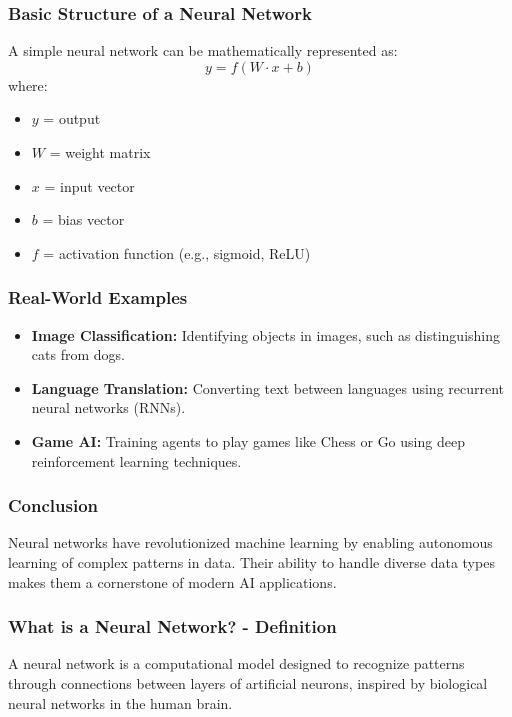 \documentclass{beamer}
\begin{document}
\begin{frame}[fragile]
    \frametitle{Basic Structure of a Neural Network}
    A simple neural network can be mathematically represented as:  
    \begin{equation}
        y = f(W \cdot x + b)
    \end{equation}
    where:
    \begin{itemize}
        \item $y$ = output
        \item $W$ = weight matrix
        \item $x$ = input vector
        \item $b$ = bias vector
        \item $f$ = activation function (e.g., sigmoid, ReLU)
    \end{itemize}
\end{frame}

\begin{frame}[fragile]
    \frametitle{Real-World Examples}
    \begin{itemize}
        \item \textbf{Image Classification:} 
            Identifying objects in images, such as distinguishing cats from dogs.
        \item \textbf{Language Translation:} 
            Converting text between languages using recurrent neural networks (RNNs).
        \item \textbf{Game AI:} 
            Training agents to play games like Chess or Go using deep reinforcement learning techniques.
    \end{itemize}
\end{frame}

\begin{frame}[fragile]
    \frametitle{Conclusion}
    Neural networks have revolutionized machine learning by enabling autonomous learning of complex patterns in data. Their ability to handle diverse data types makes them a cornerstone of modern AI applications.
\end{frame}

\begin{frame}[fragile]
    \frametitle{What is a Neural Network? - Definition}
    A neural network is a computational model designed to recognize patterns through connections between layers of artificial neurons, inspired by biological neural networks in the human brain.
\end{frame}
\end{document}
